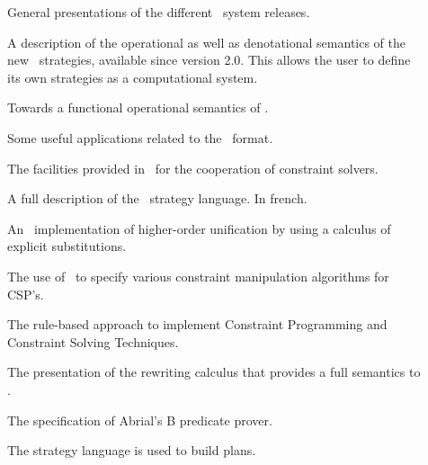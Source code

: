 \begin{description}

\item[
\cite{Elan-RwLg1996,Elan-ASF+SDF97,BorovanskyKKMR-WRLA98}
] 
General presentations of the different \elan\ system releases.


\item[
\cite{Strategies-RwLg1996,BorovanK-ASF+SDF97,Borovansky-WRLA98}
]
A description of the operational as well as denotational semantics of
the new \elan\ strategies, available since version 2.0. This allows
the user to define its own strategies as a computational system.


\item[
\cite{BKK-Fuji-98}
]
Towards a functional operational semantics of \elan.

\item[
\cite{BorovanskyJMR-WRLA98}
]
Some useful applications related to the \REF\ format.


\item[
\cite{BorovanskyCastro-WRLA98}
]
The facilities provided in \elan\ for the cooperation of constraint
solvers.

\item[
\cite{BoroThese}
]
A full description of the \elan\ strategy language. In french.

\item[
\cite{Borovansky-95}
] 
An \elan\ implementation of higher-order unification by
using a calculus of explicit substitutions.


\item[
\cite{Castro-RwLg1996,Castro-ICTAI96,Castro-ESSLLI97}
] 
The use of \elan\ to specify various constraint manipulation
algorithms for CSP's.

\item[
\cite{Castro-FI98,KirchnerR-FI98,Castro-ESSLLI97,castro:aisc:1998,castro:phd:1998}
]
The rule-based approach to implement Constraint Programming and
Constraint Solving Techniques. 

\item[
\cite{CirsteaKirchner-LivreFroCoS99,CirsteaKirchnerINRIA99}
]
The presentation of the rewriting calculus that provides a full
semantics to \elan.

\item[
\cite{CirsteaKirchner97web}
]
The specification of Abrial's B predicate prover.

\item[
\cite{dubois98b}
]
The strategy language is used to build plans.


\end{description}
